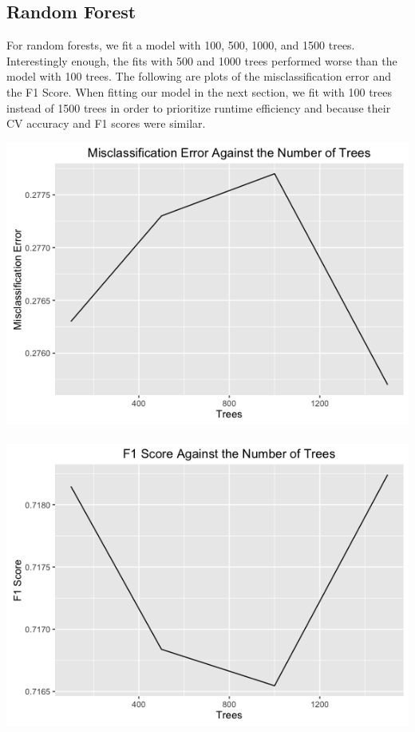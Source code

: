 \documentclass{article}
\begin{document}
\subsection{Random Forest}
For random forests, we fit a model with 100, 500, 1000, and 1500 trees. Interestingly enough, the fits with 500 and 1000 trees performed worse than the model with 100 trees. The following are plots of the misclassification error and the F1 Score. When fitting our model in the next section, we fit with 100 trees instead of 1500 trees in order to prioritize runtime efficiency and because their CV accuracy and  F1 scores were similar. \\

\centerline{\includegraphics[scale=.29]{diagrams/6rf.png} ~~~~~~~~~~~~~~~ \includegraphics[scale=.29]{diagrams/7rf.png}}
\end{document}
